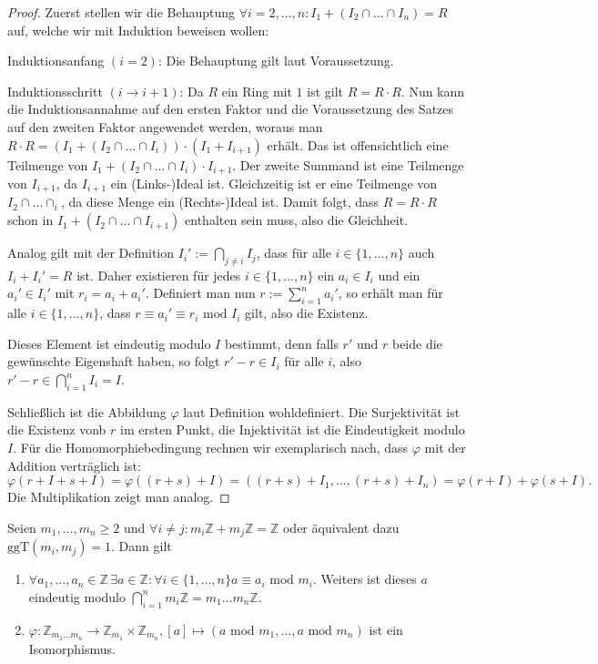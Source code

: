 \begin{proof}
    Zuerst stellen wir die Behauptung $\forall i=2,\ldots,n: I_1+(I_2\cap \ldots \cap I_n)=R$ auf, welche wir mit Induktion
    beweisen wollen:

    Induktionsanfang $(i=2)$: Die Behauptung gilt laut Voraussetzung.

    Induktionsschritt $(i\to i+1)$: Da $R$ ein Ring mit $1$ ist gilt
    $R=R\cdot R$. Nun kann die Induktionsannahme auf den ersten Faktor und die Voraussetzung des Satzes auf den zweiten Faktor angewendet werden,
    woraus man $R\cdot R=(I_1+(I_2\cap\ldots\cap I_i))\cdot(I_1+I_{i+1})$ erhält. Das ist offensichtlich eine Teilmenge
    von $I_1+(I_2\cap\ldots\cap I_i)\cdot I_{i+1}$. Der zweite Summand ist eine Teilmenge von $I_{i+1}$, da
    $I_{i+1}$ ein (Links-)Ideal ist. Gleichzeitig ist er eine Teilmenge von $I_2\cap\ldots \cap _i$, da diese Menge ein (Rechts-)Ideal ist.
    Damit folgt, dass $R=R\cdot R$ schon in $I_1+(I_2\cap\ldots \cap I_{i+1})$ enthalten sein muss, also die Gleichheit.

    Analog gilt mit der Definition $I_i':=\bigcap_{j\neq i}I_j$, dass für alle $i\in\{1,\ldots,n\}$
    auch $I_i+I_i'=R$ ist. Daher existieren für jedes $i\in\{1,\ldots,n\}$ ein $a_i\in I_i$ und ein $a_i'\in I_i'$
    mit $r_i=a_i+a_i'$. Definiert man nun $r:=\sum_{i=1}^na_i'$, so erhält man für alle $i\in\{1,\ldots,n\}$, dass
    $r\equiv a_i'\equiv r_i \text{ mod }I_i$ gilt, also die Existenz.

    Dieses Element ist eindeutig modulo $I$ bestimmt, denn falls $r'$ und $r$ beide die gewünschte Eigenshaft haben,
    so folgt $r'-r\in I_i$ für alle $i$, also $r'-r\in\bigcap_{i=1}^nI_i=I$.

    Schließlich ist die Abbildung $\varphi$ laut Definition wohldefiniert. Die Surjektivität ist die Existenz vonb $r$ im ersten Punkt,
    die Injektivität ist die Eindeutigkeit modulo $I$. Für die Homomorphiebedingung rechnen wir exemplarisch nach, dass
    $\varphi$ mit der Addition verträglich ist:
    $$\varphi(r+I+s+I)=\varphi((r+s)+I)=((r+s)+I_1,\ldots,(r+s)+I_n)=\varphi(r+I)+\varphi(s+I).$$
    Die Multiplikation zeigt man analog.
\end{proof}

\begin{corollary}
    Seien $m_1,\ldots,m_n\geq 2$ und $\forall i\neq j: m_i\mathbb{Z}+m_j\mathbb{Z}=\mathbb{Z}$
    oder äquivalent dazu $\text{ggT}(m_i,m_j)=1$. Dann gilt
    \begin{enumerate}
        \item $\forall a_1,\ldots,a_n\in\mathbb{Z}\,\exists a\in\mathbb{Z}:\forall i\in\{1,\ldots,n\}a\equiv a_i \text{ mod }m_i$.
        Weiters ist dieses $a$ eindeutig modulo $\bigcap_{i=1}^{n}m_i\mathbb{Z}=m_1\ldots m_n\mathbb{Z}$.
        \item $\varphi:\mathbb{Z}_{m_1\ldots m_n}\to \mathbb{Z}_{m_1}\times \mathbb{Z}_{m_n}, [a]\mapsto (a\text{ mod }m_1,\ldots, a\text{ mod }m_n)$
        ist ein Isomorphismus.
    \end{enumerate}
\end{corollary}



